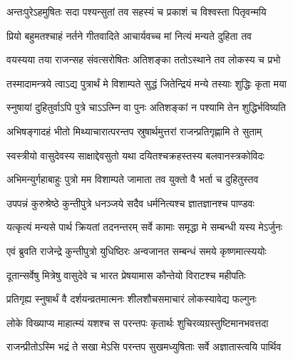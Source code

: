 


\twolineshloka
{अन्तःपुरेऽहमुषितः सदा पश्यन्सुतां तव}
{सहस्यं च प्रकाशं च विश्वस्ता पितृवन्मयि}


\twolineshloka
{प्रियो बहुमतश्चाहं नर्तने गीतवादिते}
{आचार्यवच्च मां नित्यं मन्यते दुहिता तव}


\twolineshloka
{वयस्यया तया राजन्सह संवत्सरोषितः}
{अतिशङ्का ततोऽस्थाने तव लोकस्य च प्रभो}


\twolineshloka
{तस्मादामन्त्रये त्वाऽद्य पुत्रार्थं मे विशाम्पते}
{सुद्धं जितेन्द्रियं मन्ये तस्याः शुद्धिः कृता मया}


\twolineshloka
{स्नुषायां दुहितुर्वाऽपि पुत्रे चाऽऽत्म्नि वा पुनः}
{अतिशङ्कां न पश्यामि तेन शुद्धिर्भविष्यति}


\twolineshloka
{अभिषङ्गादहं भीतो मिथ्याचारात्परन्तप}
{स्रुषार्थमुत्तरां राजन्प्रतिगृह्णामि ते सुताम्}


\twolineshloka
{स्वस्त्रीयो वासुदेवस्य साक्षाद्देवसुतो यथा}
{दयितश्चक्रहस्तस्य बलवानस्त्रकोविदः}


\twolineshloka
{अभिमन्युर्गहाबाहुः पुत्रो मम विशाम्पते}
{जामाता तव युक्तो वै भर्ता च दुहितुस्तव}




\twolineshloka
{उपपन्नं कुरुश्रेष्ठे कुन्तीपुत्रे धनञ्जये}
{सदैव धर्मनित्यश्च ज्ञातज्ञानश्च पाण्डवः}


\twolineshloka
{यत्कृत्यं मन्यसे पार्थ क्रियतां तदनन्तरम्}
{सर्वे कामाः समृद्धा मे सम्बन्धी यस्य मेऽर्जुनः}



\twolineshloka
{एवं ब्रुवति राजेन्द्रे कुन्तीपुत्रो युधिष्ठिरः}
{अन्वजानत सम्बन्धं समये कृष्णमात्स्ययोः}


\twolineshloka
{दूतान्सर्वेषु मित्रेषु वासुदेवे च भारत}
{प्रेषयामास कौन्तेयो विराटश्च महीपतिः}



\twolineshloka
{प्रतिगृह्य स्नुषार्थं वै दर्शयन्व्रतमात्मनः}
{शीलशौचसमाचारं लोकस्यावेद्य फल्गुनः}


\twolineshloka
{लोके विख्याप्य माहात्म्यं यशश्च स परन्तपः}
{कृतार्थः शुचिरव्यग्रस्तुष्टिमानभवत्तदा}




\twolineshloka
{राजन्प्रीतोऽस्मि भद्रं ते सखा मेऽसि परन्तप}
{सुखमध्युषिताः सर्वे अज्ञातास्त्वयि पार्थिव}



